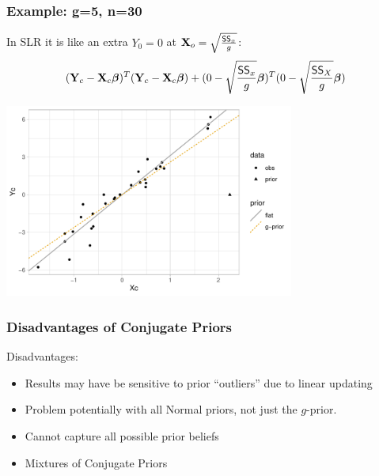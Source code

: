 \documentclass[handout]{beamer}\usepackage[]{graphicx}\usepackage[]{color}
\makeatletter
\def\maxwidth{ %
  \ifdim\Gin@nat@width>\linewidth
    \linewidth
  \else
    \Gin@nat@width
  \fi
}
\newenvironment{knitrout}{}{} %
\makeatother
\begin{document}
\begin{frame}\frametitle{Example: g=5, n=30}

In SLR it is like an extra $Y_0 = 0$ at $\mathbf{X}_o = \sqrt{\frac{\textsf{SS}_x}{g}}$:
$$ ( \mathbf{Y}_c  - \mathbf{X}_c \boldsymbol{\beta})^T(\mathbf{Y}_c - \mathbf{X}_c\boldsymbol{\beta}) + (0 - \sqrt{\frac{\textsf{SS}_x}{g}}\boldsymbol{\beta})^T (0 - \sqrt{\frac{\textsf{SS}_X}{g}} \boldsymbol{\beta})   $$
\pause


\begin{knitrout}
\color{fgcolor}
\includegraphics[width=\maxwidth,height=2.5in]{figure/unnamed-chunk-1-1} 

\end{knitrout}

\end{frame}



\begin{frame}
  \frametitle{Disadvantages of Conjugate Priors}
  Disadvantages: \pause
\begin{itemize}
\item Results  may have be sensitive to prior ``outliers'' due to
  linear updating \pause
\item Problem potentially with all Normal priors, not just the
  $g$-prior. \pause
\item Cannot capture all possible prior beliefs \pause
\item Mixtures of Conjugate Priors
\end{itemize}
\end{frame}
\end{document}
